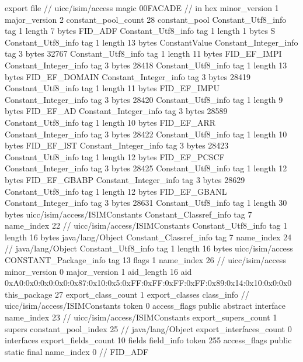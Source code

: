 export file {		// uicc/isim/access
	magic	00FACADE		 // in hex
	minor_version	1
	major_version	2
	constant_pool_count	28
	constant_pool {
		Constant_Utf8_info {
			tag	1
			length	7
			bytes	FID_ADF
		}
		Constant_Utf8_info {
			tag	1
			length	1
			bytes	S
		}
		Constant_Utf8_info {
			tag	1
			length	13
			bytes	ConstantValue
		}
		Constant_Integer_info {
			tag	3
			bytes	32767
		}
		Constant_Utf8_info {
			tag	1
			length	11
			bytes	FID_EF_IMPI
		}
		Constant_Integer_info {
			tag	3
			bytes	28418
		}
		Constant_Utf8_info {
			tag	1
			length	13
			bytes	FID_EF_DOMAIN
		}
		Constant_Integer_info {
			tag	3
			bytes	28419
		}
		Constant_Utf8_info {
			tag	1
			length	11
			bytes	FID_EF_IMPU
		}
		Constant_Integer_info {
			tag	3
			bytes	28420
		}
		Constant_Utf8_info {
			tag	1
			length	9
			bytes	FID_EF_AD
		}
		Constant_Integer_info {
			tag	3
			bytes	28589
		}
		Constant_Utf8_info {
			tag	1
			length	10
			bytes	FID_EF_ARR
		}
		Constant_Integer_info {
			tag	3
			bytes	28422
		}
		Constant_Utf8_info {
			tag	1
			length	10
			bytes	FID_EF_IST
		}
		Constant_Integer_info {
			tag	3
			bytes	28423
		}
		Constant_Utf8_info {
			tag	1
			length	12
			bytes	FID_EF_PCSCF
		}
		Constant_Integer_info {
			tag	3
			bytes	28425
		}
		Constant_Utf8_info {
			tag	1
			length	12
			bytes	FID_EF_GBABP
		}
		Constant_Integer_info {
			tag	3
			bytes	28629
		}
		Constant_Utf8_info {
			tag	1
			length	12
			bytes	FID_EF_GBANL
		}
		Constant_Integer_info {
			tag	3
			bytes	28631
		}
		Constant_Utf8_info {
			tag	1
			length	30
			bytes	uicc/isim/access/ISIMConstants
		}
		Constant_Classref_info {
			tag	7
			name_index	22		// uicc/isim/access/ISIMConstants
		}
		Constant_Utf8_info {
			tag	1
			length	16
			bytes	java/lang/Object
		}
		Constant_Classref_info {
			tag	7
			name_index	24		// java/lang/Object
		}
		Constant_Utf8_info {
			tag	1
			length	16
			bytes	uicc/isim/access
		}
		CONSTANT_Package_info {
			tag	13
			flags	1
			name_index	26		// uicc/isim/access
			minor_version	0
			major_version	1
			aid_length	16
			aid	0xA0:0x0:0x0:0x0:0x87:0x10:0x5:0xFF:0xFF:0xFF:0xFF:0x89:0x14:0x10:0x0:0x0
		}
	}
	this_package	27
	export_class_count	1
	export_classes {
		class_info {		// uicc/isim/access/ISIMConstants
			token	0
			access_flags	public abstract interface
			name_index	23		// uicc/isim/access/ISIMConstants
			export_supers_count	1
			supers {
				constant_pool_index	25		// java/lang/Object
			}
			export_interfaces_count	0
			interfaces {
			}
			export_fields_count	10
			fields {
			field_info {
				token	255
				access_flags	public static final
				name_index	0		// FID_ADF
}}}}}
